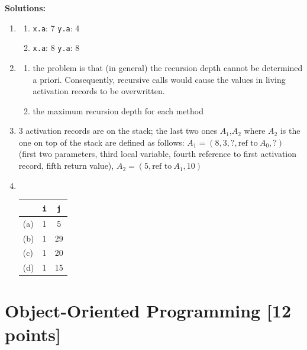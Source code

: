 \documentclass{article}
\newcommand{\solution}[1] {\textbf{Solutions:}\\ #1}
\begin{document}
\solution{
\begin{enumerate}
\item
  \begin{enumerate}   
  \item \lstinline!x.a!: 7 \quad  \lstinline!y.a!: 4
  \item \lstinline!x.a!: 8  \quad \lstinline!y.a!: 8
  \end{enumerate}
\item 
  \begin{enumerate}
  \item the problem is that (in general) the recursion depth cannot be
    determined a priori. Consequently, recursive calls would cause the
    values in living activation records to be overwritten.
  \item the maximum recursion depth for each method
  \end{enumerate}
\item 3 activation records are on the stack; the last two ones
  $A_1$,$A_2$ where $A_2$ is the one on top of the stack are defined
  as follows: $A_1=(8,3,?,\text{ref to}~A_{0} , ?)$ (first two parameters,
  third local variable, fourth reference to first activation record,
  fifth return value), $A_2=(5, \text{ref to}~A_1, 10)$  
\item\hfill\\
  \begin{tabular}{lcc}
    & \lstinline!i! & \lstinline!j! \\ \hline
   (a) &  1 & 5 \\
   (b) & 1 & 29 \\
   (c) & 1 & 20 \\
   (d) & 1 & 15 \\
  \end{tabular}

  
\end{enumerate}
}

\newpage

\section{Object-Oriented Programming [12 points]}
\end{document}
